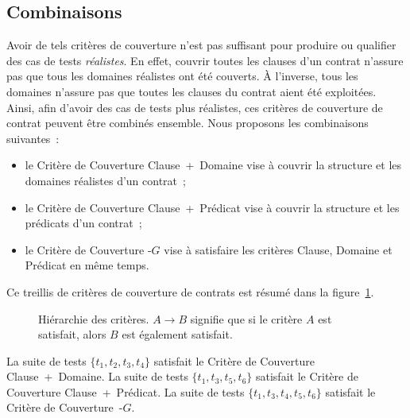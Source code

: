 \subsection{Combinaisons}
\label{subsection:test:combination}

Avoir de tels critères de couverture n'est pas suffisant pour produire ou
qualifier des cas de tests {\em réalistes}. En effet, couvrir toutes les clauses
d'un contrat n'assure pas que tous les domaines réalistes ont été couverts. À
l'inverse, tous les domaines n'assure pas que toutes les clauses du contrat
aient été exploitées. Ainsi, afin d'avoir des cas de tests plus réalistes, ces
critères de couverture de contrat peuvent être combinés ensemble. Nous proposons
les combinaisons suivantes~:
%
\begin{itemize}

\item le Critère de Couverture Clause~+~Domaine vise à couvrir la structure et
les domaines réalistes d'un contrat~;

\item le Critère de Couverture Clause~+~Prédicat vise à couvrir la structure et
les prédicats d'un contrat~;

\item le Critère de Couverture -$G$ vise à satisfaire les
critères Clause, Domaine et Prédicat en même temps.

\end{itemize}
%
Ce {\strong treillis} de critères de couverture de contrats est résumé dans la
figure~\ref{figure:test:lattice}.

\begin{figure}


\caption[Hiérarchie des critères.]{\label{figure:test:lattice} Hiérarchie des
critères. $A \rightarrow B$ signifie que si le critère $A$ est satisfait, alors
$B$ est également satisfait.}

\end{figure}

\begin{example}

La suite de tests $\{t_1, t_2, t_3, t_4\}$ satisfait le Critère de Couverture
Clause~+~Domaine. La suite de tests $\{t_1, t_3, t_5, t_6\}$ satisfait le
Critère de Couverture Clause~+~Prédicat. La suite de tests $\{t_1, t_3, t_4,
t_5, t_6\}$ satisfait le Critère de Couverture~-$G$.

\end{example}
